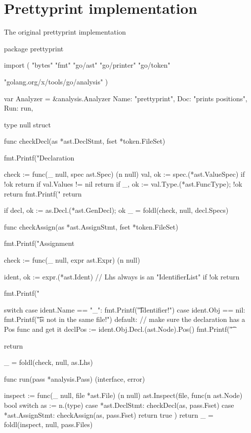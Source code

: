 \section{Prettyprint implementation}\label{appendix:prettyprint-func}
\begin{code}
	\caption{The original prettyprint implementation}
\end{code}
\begin{code}
	\begin{gocode}
package prettyprint

import (
	"bytes"
	"fmt"
	"go/ast"
	"go/printer"
	"go/token"

	"golang.org/x/tools/go/analysis"
)

var Analyzer = &analysis.Analyzer{
	Name: "prettyprint",
	Doc:  "prints positions",
	Run:  run,
}

type null struct{}

func checkDecl(as *ast.DeclStmt, fset *token.FileSet) {
	fmt.Printf("Declaration %

	check := func(_ null, spec ast.Spec) (n null) {
		val, ok := spec.(*ast.ValueSpec)
		if !ok {
			return
		}
		if val.Values != nil {
			return
		}
		if _, ok := val.Type.(*ast.FuncType); !ok {
			return
		}
		fmt.Printf("\tIdent %
		return
	}

	if decl, ok := as.Decl.(*ast.GenDecl); ok {
		_ = foldl(check, null{}, decl.Specs)
	}
}

func checkAssign(as *ast.AssignStmt, fset *token.FileSet) {
	fmt.Printf("Assignment %

	check := func(_ null, expr ast.Expr) (n null) {
		ident, ok := expr.(*ast.Ident) // Lhs always is an "IdentifierList"
		if !ok {
			return
		}

		fmt.Printf("\tIdent %

		switch {
		case ident.Name == "_":
			fmt.Printf("\t\tBlank Identifier!\n")
		case ident.Obj == nil:
			fmt.Printf("\t\tDecl is not in the same file!\n")
		default:
			// make sure the declaration has a Pos func and get it
			declPos := ident.Obj.Decl.(ast.Node).Pos()
			fmt.Printf("\t\tDecl %
		}

		return
	}
	_ = foldl(check, null{}, as.Lhs)
}

func run(pass *analysis.Pass) (interface{}, error) {
	inspect := func(_ null, file *ast.File) (n null) {
		ast.Inspect(file, func(n ast.Node) bool {
			switch as := n.(type) {
			case *ast.DeclStmt:
				checkDecl(as, pass.Fset)
			case *ast.AssignStmt:
				checkAssign(as, pass.Fset)
			}
			return true
		})
		return
	}
	_ = foldl(inspect, null{}, pass.Files)

}
\end{gocode}
\end{code}
